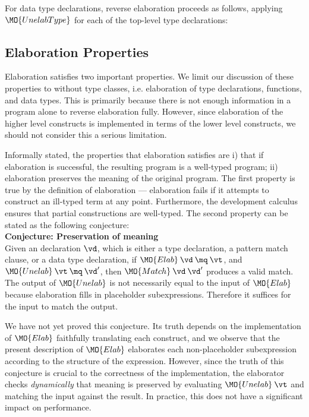 \noindent
For data type declarations, reverse elaboration proceeds as follows, applying $\MO{UnelabType}$
for each of the top-level type declarations:



\subsection{Elaboration Properties}

Elaboration satisfies two important properties. We limit our discussion of
these properties to \IdrisM{} without type classes, i.e. elaboration of type 
declarations, functions, and data types. This is primarily because there is not
enough information in a \TT{} program alone to reverse elaboration fully. However, since
elaboration of the higher level \Idris{} constructs is implemented in terms of
the lower level \IdrisM{} constructs, we should not consider this a serious
limitation.

Informally stated, the properties that elaboration satisfies are
i) that if elaboration is successful, the
resulting program is a well-typed \TT{} program; ii) elaboration preserves the
meaning of the original \Idris{} program. The first property is true by the
definition of elaboration --- elaboration fails if it attempts to construct an ill-typed
term at any point. Furthermore, the development calculus \TTdev{} ensures that 
partial constructions are well-typed.
The second property can be stated as the following conjecture:
\\

\noindent
\textbf{Conjecture: Preservation of meaning}\\
Given an \IdrisM{} declaration $\vd$, which is either a type declaration, a
pattern match clause, or a data type declaration,
if $\MO{Elab}\:\vd\:\mq\:\vt$, and $\MO{Unelab}\:\vt\:\mq\:\vd'$,
then $\MO{Match}\:\vd\:\vd'$ produces a valid match.
\\

The output of $\MO{Unelab}$ is not necessarily equal to the input of $\MO{Elab}$
because elaboration fills in placeholder subexpressions. Therefore it suffices for
the input to match the output.

We have not yet proved this conjecture. Its truth depends on the implementation
of $\MO{Elab}$ faithfully translating each construct, and we observe that the
present description of $\MO{Elab}$ elaborates each non-placeholder subexpression
according to the structure of the expression. However, since the truth of this
conjecture is crucial to the correctness of the implementation, the elaborator
checks \emph{dynamically} that meaning is preserved by evaluating
$\MO{Unelab}\:\vt$ and matching the input against the result. In practice, this
does not have a significant impact on performance.

